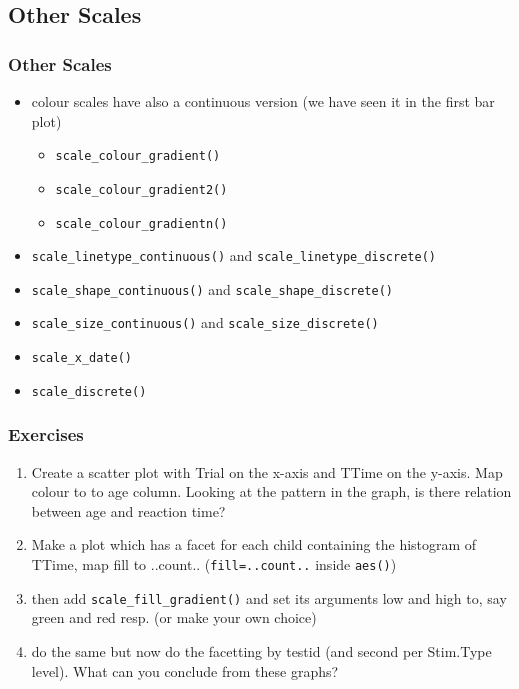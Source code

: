\documentclass[xcolor={table},c]{beamer}
\begin{document}
\subsection{Other Scales}
\begin{frame}[fragile]\frametitle{Other Scales}
  \begin{itemize}
  \item colour scales have also a continuous version (we have seen it in the first bar plot)
    \begin{itemize}
    \item \texttt{scale\_colour\_gradient()}
    \item \texttt{scale\_colour\_gradient2()}
    \item \texttt{scale\_colour\_gradientn()}
    \end{itemize}
  \item \texttt{scale\_linetype\_continuous()} and \texttt{scale\_linetype\_discrete()}
  \item \texttt{scale\_shape\_continuous()} and \texttt{scale\_shape\_discrete()}
  \item \texttt{scale\_size\_continuous()} and \texttt{scale\_size\_discrete()}
  \item \texttt{scale\_x\_date()}
  \item \texttt{scale\_discrete()}
  \end{itemize}
\end{frame}


\begin{frame}[fragile]\frametitle{Exercises}
\begin{enumerate}
\item Create a scatter plot with Trial on the x-axis and TTime on the y-axis. Map colour to to age column. Looking at the pattern in the graph, is there relation between age and reaction time?
\item Make a plot which has a facet for each child containing the histogram of TTime, map fill to ..count.. (\texttt{fill=..count..} inside  \texttt{aes()}) 
\item then add \texttt{scale\_fill\_gradient()} and set its arguments low and high to, say green and red resp. (or make your own choice)
\item do the same but now do the facetting by testid (and second per Stim.Type level). What can you conclude from these graphs?
\end{enumerate}
\end{frame}
\end{document}
